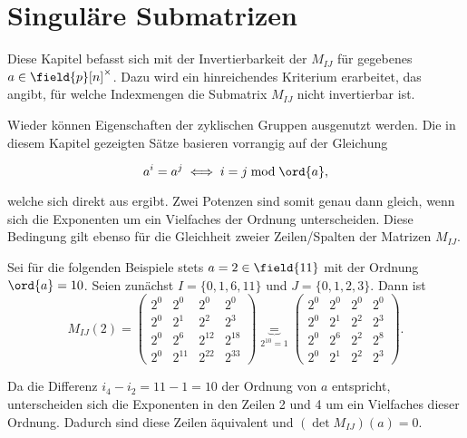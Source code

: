 \section{Singuläre Submatrizen} \label{sec:singulaereSubmatrizen}

Diese Kapitel befasst sich mit der Invertierbarkeit der $M_{IJ}$ für gegebenes $a \in \field{p}[n]^\times$. Dazu wird ein hinreichendes Kriterium erarbeitet, das angibt, für welche Indexmengen die Submatrix $M_{IJ}$ nicht invertierbar ist. 

Wieder können Eigenschaften der zyklischen Gruppen ausgenutzt werden. Die in diesem Kapitel gezeigten Sätze basieren vorrangig auf der Gleichung

\begin{equation*}
    a^i = a^j \iff i = j \bmod \ord{a},
\end{equation*}

welche sich direkt aus  ergibt. Zwei Potenzen sind somit genau dann gleich, wenn sich die Exponenten um ein Vielfaches der Ordnung unterscheiden. Diese Bedingung gilt ebenso für die Gleichheit zweier Zeilen/Spalten der Matrizen $M_{IJ}$. 

Sei für die folgenden Beispiele stets $a = 2 \in \field{11}$ mit der Ordnung $\ord{a} = 10$. Seien zunächst $I=\{0,1,6,11\}$ und $J=\{0,1,2,3\}$. Dann ist 
\begin{equation*}
    M_{IJ}(2) = \begin{pmatrix}
        2^{0} & 2^{0} & 2^{0} & 2^{0} \\
        2^{0} & 2^{1} & 2^{2} & 2^{3} \\
        2^{0} & 2^{6} & 2^{12} & 2^{18} \\
        2^{0} & 2^{11} & 2^{22} & 2^{33} 
    \end{pmatrix} \underbrace{=}_{2^{10}=1} \begin{pmatrix}
        2^{0} & 2^{0} & 2^{0} & 2^{0} \\
        2^{0} & 2^{1} & 2^{2} & 2^{3} \\
        2^{0} & 2^{6} & 2^{2} & 2^{8} \\
        2^{0} & 2^{1} & 2^{2} & 2^{3} 
    \end{pmatrix}.
\end{equation*}

Da die Differenz $i_4 - i_2 = 11 - 1 = 10$ der Ordnung von $a$ entspricht, unterscheiden sich die Exponenten in den Zeilen 2 und 4 um ein Vielfaches dieser Ordnung. Dadurch sind diese Zeilen äquivalent und $(\det M_{IJ})(a) = 0$. 


